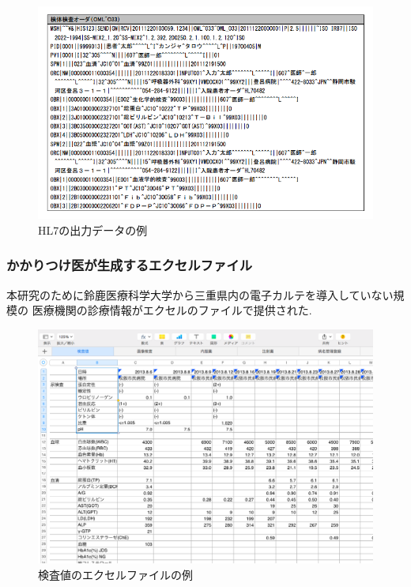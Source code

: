 	\begin{figure}[htbp]
    \begin{center}
			\includegraphics[width=12cm, bb=0 0 688 437, clip]{./gazou/ss-mix_sampledata.png}
    \end{center}
    \caption{HL7の出力データの例}
		\label{ss-mix_sampledata}
	\end{figure}



  \subsubsection{かかりつけ医が生成するエクセルファイル}
  本研究のために鈴鹿医療科学大学から三重県内の電子カルテを導入していない規模の
  医療機関の診療情報がエクセルのファイルで提供された.

  \begin{figure}[htbp]
    \begin{center}
      \includegraphics[width=13cm, bb=0 0 1049 733]{./gazou/excel-data.png}
    \end{center}
    \caption{検査値のエクセルファイルの例}
    \label{excel-data}
  \end{figure}

